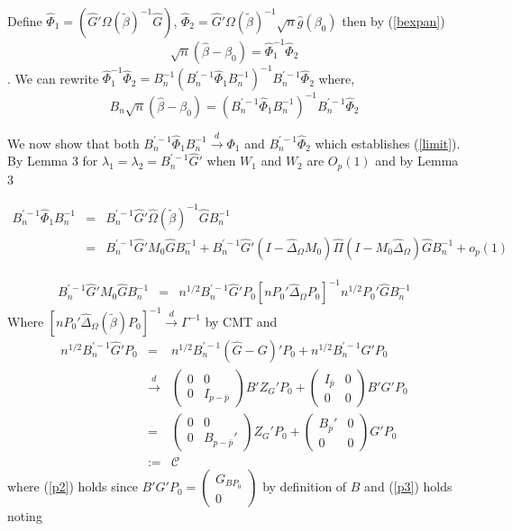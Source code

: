 \documentclass[11pt, fleqn]{article}
\begin{document}
Define $\hat{\Phi}_1=(\hat{G}'\Omega(\tilde{\beta})^{-1}\hat{G})$, $\hat{\Phi}_2= \hat{G}'\Omega(\tilde{\beta})^{-1}\sqrt{n}\hat{g}(\beta_0)$ then by  (\ref{bexpan}) \begin{equation}\sqrt{n}(\hat{\beta}-\beta_0)=\hat{\Phi}_1^{-1}\hat{\Phi}_2\end{equation}.
 We can rewrite   $\hat{\Phi}_1^{-1}\hat{\Phi}_2=B_n^{-1}(B_n^{'-1}\hat{\Phi}_1 B_n^{-1})^{-1}
  B_n^{'-1}\hat{\Phi}_2$ where,
  \begin{equation} B_n \sqrt{n}(\hat{\beta}-\beta_0) =(B_n^{'-1}\hat{\Phi}_1 B_n^{-1})^{-1}B_n^{'-1}\hat{\Phi}_2\end{equation}

  We now show that both $B_n^{'-1}\hat{\Phi}_1 B_n^{-1}\overset{d}{\rightarrow}\Phi_1$ and $B_n^{'-1}\hat{\Phi}_2$ which establishes (\ref{limit}).
 By Lemma 3 for $\lambda_1=\lambda_2=B_n^{'-1}\hat{G}'$ when $W_1$ and $W_2$ are $O_p(1)$ and by Lemma 3
 
 
 \begin{eqnarray*}\label{p1} B_n^{'-1}\hat{\Phi}_1B_n^{-1}&=& B_n^{'-1}\hat{G}'\hat{\Omega}(\tilde{\beta})^{-1}\hat{G} B_n^{-1}\\
 &=& B_n^{'-1}\hat{G}'M_0\hat{G} B_n^{-1}
 +B_n^{'-1}\hat{G}'(I-\hat{\Delta}_{\Omega}M_0)\hat{\Pi}(I-M_0\hat{\Delta}_{\Omega})\hat{G}B_n^{-1} +o_p(1)
  \end{eqnarray*}

\begin{eqnarray} B_n^{'-1}\hat{G}'M_0\hat{G} B_n^{-1}&=&n^{1/2}B_n^{'-1}\hat{G}'P_0[nP_0'\hat{\Delta}_{\Omega}P_0]^{-1}n^{1/2}P_0'\hat{G} B_n^{-1}
\end{eqnarray}
Where $[nP_0'\hat{\Delta}_{\Omega}(\tilde{\beta})P_0]^{-1}\overset{d}{\rightarrow} 
\Gamma^{-1}$ by CMT and 
\begin{eqnarray} n^{1/2}B_n^{'-1}\hat{G}'P_0 &=& 
n^{1/2}B_n^{'-1}(\hat{G}-G)'P_0 + n^{1/2}B_n^{'-1}G'P_0\\
&\overset{d}{\rightarrow} & \left(\begin{array}{cc} 0 & 0\\ 0 & I_{p-\bar{p}}\end{array}\right)B'Z_G'P_0+ \left(\begin{array}{cc} I_{\bar{p}} & 0\\ 0 & 0\end{array}\right) B'G'P_0\label{p2}\\
&=& \left(\begin{array}{cc} 0 & 0\\ 0 & B_{p-\bar{p}}'\end{array}\right)Z_G'P_0+\left(\begin{array}{cc} B_{\bar{p}}' & 0\\ 0 & 0\end{array}\right)G'P_0 \label{p3} \\
&:=& \mathcal{C}\end{eqnarray}
 where (\ref{p2}) holds since  $B'G'P_0=\left(\begin{array}{c} G_{BP_0} \\ 0 \end{array}\right)$ by definition of $B$ and (\ref{p3}) holds noting
 
\end{document}

